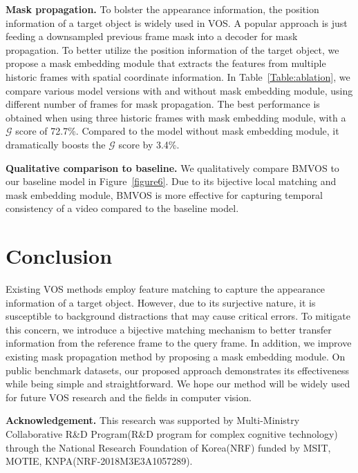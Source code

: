 \documentclass[10pt,twocolumn,letterpaper]{article}
\begin{document}
	
	\vspace{1mm}
	\noindent\textbf{Mask propagation.} To bolster the appearance information, the position information of a target object is widely used in VOS. A popular approach is just feeding a downsampled previous frame mask into a decoder for mask propagation. To better utilize the position information of the target object, we propose a mask embedding module that extracts the features from multiple historic frames with spatial coordinate information. In Table~\ref{Table:ablation}, we compare various model versions with and without mask embedding module, using different number of frames for mask propagation. The best performance is obtained when using three historic frames with mask embedding module, with a $\mathcal{G}$ score of 72.7\%. Compared to the model without mask embedding module, it dramatically boosts the $\mathcal{G}$ score by 3.4\%.
	
	
	\vspace{1mm}
	\noindent\textbf{Qualitative comparison to baseline.} We qualitatively compare BMVOS to our baseline model in Figure~\ref{figure6}. Due to its bijective local matching and mask embedding module, BMVOS is more effective for capturing temporal consistency of a video compared to the baseline model. 
	
	
	
	\section{Conclusion}
	Existing VOS methods employ feature matching to capture the appearance information of a target object. However, due to its surjective nature, it is susceptible to background distractions that may cause critical errors. To mitigate this concern, we introduce a bijective matching mechanism to better transfer information from the reference frame to the query frame. In addition, we improve existing mask propagation method by proposing a mask embedding module. On public benchmark datasets, our proposed approach demonstrates its effectiveness while being simple and straightforward. We hope our method will be widely used for future VOS research and the fields in computer vision. 
	
	
	\vspace*{\fill}
	\noindent\footnotesize\textbf{Acknowledgement.} This research was supported by Multi-Ministry Collaborative R\&D Program(R\&D program for complex cognitive technology) through the National Research Foundation of Korea(NRF) funded by MSIT, MOTIE, KNPA(NRF-2018M3E3A1057289).
	
	
	{\small
		
		}
	
\end{document}
